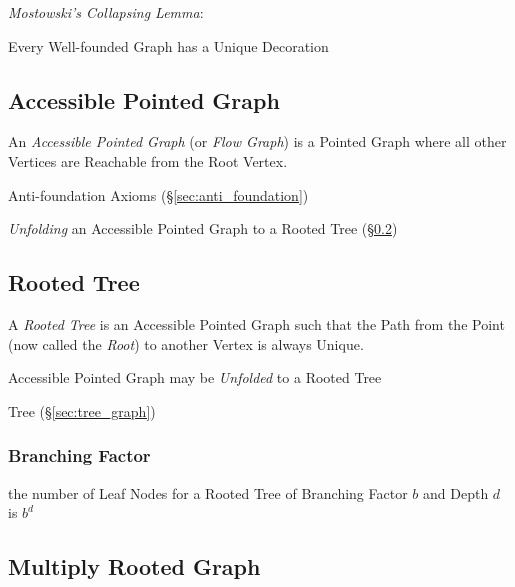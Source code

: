 \emph{Mostowski's Collapsing Lemma}: \cite{aczel88}

Every Well-founded Graph has a Unique Decoration %



\subsection{Accessible Pointed Graph}\label{sec:accessible_pointed}

An \emph{Accessible Pointed Graph} (or \emph{Flow Graph}) is a Pointed
Graph where all other Vertices are Reachable from the Root Vertex.

Anti-foundation Axioms (\S\ref{sec:anti_foundation})

\emph{Unfolding} an Accessible Pointed Graph to a Rooted Tree
(\S\ref{sec:rooted_tree})



\subsection{Rooted Tree}\label{sec:rooted_tree}

A \emph{Rooted Tree} is an Accessible Pointed Graph such that the Path
from the Point (now called the \emph{Root}) to another Vertex is
always Unique.

Accessible Pointed Graph may be \emph{Unfolded} to a Rooted Tree

Tree (\S\ref{sec:tree_graph})



\subsubsection{Branching Factor}\label{sec:branching_factor}

the number of Leaf Nodes for a Rooted Tree of Branching Factor $b$ and
Depth $d$ is $b^d$ %



\subsection{Multiply Rooted Graph}\label{sec:multiply_rooted}




